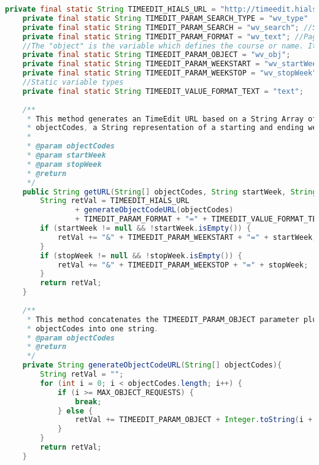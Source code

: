 \documentclass[../main.tex]{subfiles}
\begin{document}
\begin{lstlisting}[language=Java, frame=single, caption={URL-genereringsmetoder fra klassen TimeEditService, som er grovt kortet ned.}]
    private final static String TIMEEDIT_HIALS_URL = "http://timeedit.hials.no/4DACTION/WebShowSearch/1/1-0?";
    private final static String TIMEDIT_PARAM_SEARCH_TYPE = "wv_type"
    private final static String TIMEDIT_PARAM_SEARCH = "wv_search"; //Search variable. Can be used with course codes or names.
    private final static String TIMEDIT_PARAM_FORMAT = "wv_text"; //Page will not return anything unless this is added first in the set of variables.    
    //The "object" is the variable which defines the course or name. It is an ID unique to the Timeedit system
    private final static String TIMEEDIT_PARAM_OBJECT = "wv_obj";
    private final static String TIMEEDIT_PARAM_WEEKSTART = "wv_startWeek";
    private final static String TIMEEDIT_PARAM_WEEKSTOP = "wv_stopWeek";
    //Static variable types
    private final static String TIMEEDIT_VALUE_FORMAT_TEXT = "text";
    
    /**
     * This method generates an TimeEdit URL based on a String Array of
     * objectCodes, a String representation of a starting and ending week.
     *
     * @param objectCodes
     * @param startWeek
     * @param stopWeek
     * @return
     */
    public String getURL(String[] objectCodes, String startWeek, String stopWeek) {
        String retVal = TIMEEDIT_HIALS_URL                
                + generateObjectCodeURL(objectCodes)
                + TIMEDIT_PARAM_FORMAT + "=" + TIMEEDIT_VALUE_FORMAT_TEXT;
        if (startWeek != null && !startWeek.isEmpty()) {
            retVal += "&" + TIMEEDIT_PARAM_WEEKSTART + "=" + startWeek;
        }
        if (stopWeek != null && !stopWeek.isEmpty()) {
            retVal += "&" + TIMEEDIT_PARAM_WEEKSTOP + "=" + stopWeek;
        }
        return retVal;
    }
    
    /**
     * This method concatenates the TIMEEDIT_PARAM_OBJECT parameter plus a String array of 
     * objectCodes into one string.
     * @param objectCodes
     * @return 
     */
    private String generateObjectCodeURL(String[] objectCodes){
        String retVal = "";
        for (int i = 0; i < objectCodes.length; i++) {
            if (i >= MAX_OBJECT_REQUESTS) {
                break;
            } else {
                retVal += TIMEEDIT_PARAM_OBJECT + Integer.toString(i + 1) + "=" + objectCodes[i] + "&";
            }
        }
        return retVal;
    }
\end{lstlisting}
\end{document}
